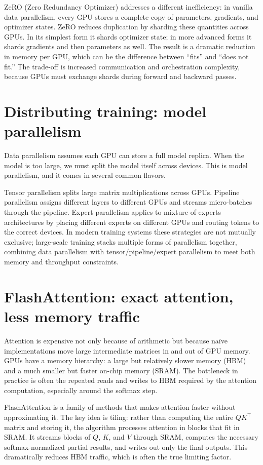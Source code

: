 ZeRO (Zero Redundancy Optimizer) addresses a different inefficiency: in vanilla data parallelism, every GPU stores a complete copy of parameters, gradients, and optimizer states. ZeRO reduces duplication by sharding these quantities across GPUs. In its simplest form it shards optimizer state; in more advanced forms it shards gradients and then parameters as well. The result is a dramatic reduction in memory per GPU, which can be the difference between “fits” and “does not fit.” The trade-off is increased communication and orchestration complexity, because GPUs must exchange shards during forward and backward passes.

\section{Distributing training: model parallelism}
Data parallelism assumes each GPU can store a full model replica. When the model is too large, we must split the model itself across devices. This is model parallelism, and it comes in several common flavors.

Tensor parallelism splits large matrix multiplications across GPUs. Pipeline parallelism assigns different layers to different GPUs and streams micro-batches through the pipeline. Expert parallelism applies to mixture-of-experts architectures by placing different experts on different GPUs and routing tokens to the correct devices. In modern training systems these strategies are not mutually exclusive; large-scale training stacks multiple forms of parallelism together, combining data parallelism with tensor/pipeline/expert parallelism to meet both memory and throughput constraints.

\section{FlashAttention: exact attention, less memory traffic}
Attention is expensive not only because of arithmetic but because naïve implementations move large intermediate matrices in and out of GPU memory. GPUs have a memory hierarchy: a large but relatively slower memory (HBM) and a much smaller but faster on-chip memory (SRAM). The bottleneck in practice is often the repeated reads and writes to HBM required by the attention computation, especially around the softmax step.

FlashAttention is a family of methods that makes attention faster without approximating it. The key idea is tiling: rather than computing the entire \(QK^\top\) matrix and storing it, the algorithm processes attention in blocks that fit in SRAM. It streams blocks of \(Q\), \(K\), and \(V\) through SRAM, computes the necessary softmax-normalized partial results, and writes out only the final outputs. This dramatically reduces HBM traffic, which is often the true limiting factor.

